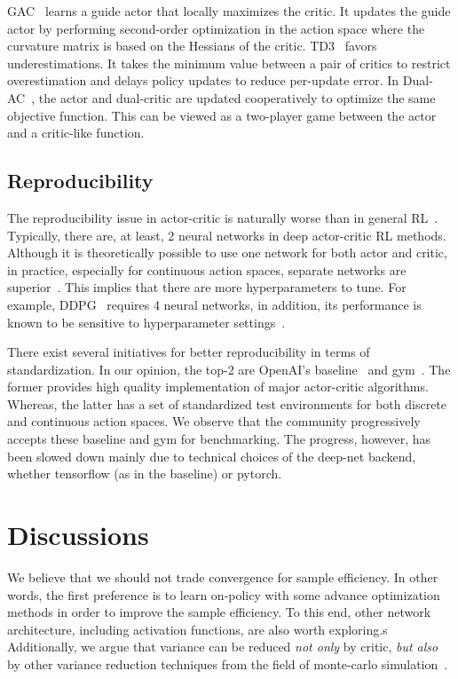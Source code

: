 GAC~\cite{} learns a guide actor that locally maximizes the critic.
It updates the guide actor by performing second-order optimization in
the action space where the curvature matrix is based on the Hessians of the critic.
TD3~\cite{} favors underestimations.
It takes the minimum value between a pair of critics to restrict overestimation and
delays policy updates to reduce per-update error.
In Dual-AC~\cite{}, the actor and dual-critic are updated cooperatively to
optimize the same objective function.
This can be viewed as a two-player game between the actor and a critic-like function.

\subsection{Reproducibility}
The reproducibility issue in actor-critic is naturally worse than in general RL~\cite{}.
Typically, there are, at least, 2 neural networks in deep actor-critic RL methods.
Although it is theoretically possible to use one network for both actor and critic,
in practice, especially for continuous action spaces, separate networks are superior~\cite{A3c}.
This implies that there are more hyperparameters to tune.
For example, DDPG~\cite{} requires 4 neural networks, in addition,
its performance is known to be sensitive to hyperparameter settings~\cite{}.

There exist several initiatives for better reproducibility in terms of standardization.
In our opinion, the top-2 are OpenAI's baseline~\cite{} and gym~\cite{}.
The former provides high quality implementation of major actor-critic algorithms.
Whereas, the latter has a set of standardized test environments for both discrete and continuous action spaces.
We observe that the community progressively accepts these baseline and gym for benchmarking.
The progress, however, has been slowed down mainly due to technical choices of the deep-net backend,
whether tensorflow (as in the baseline) or pytorch.

\section{Discussions}
We believe that we should not trade convergence for sample efficiency.
In other words, the first preference is to learn on-policy with some advance optimization methods
in order to improve the sample efficiency.
To this end, other network architecture, including activation functions, are also worth exploring.s
Additionally, we argue that variance can be reduced \emph{not only} by critic,
\emph{but also} by other variance reduction techniques from the field of monte-carlo simulation~\cite{}.

